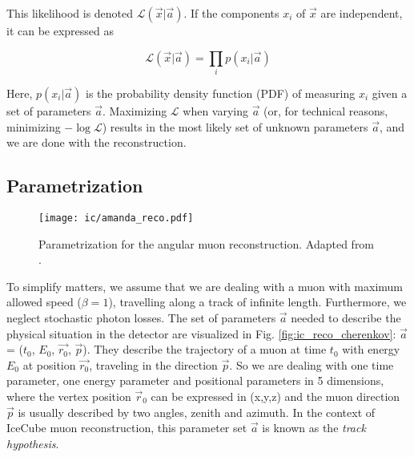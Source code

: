 This likelihood is denoted $\mathcal{L}(\vec{x}|\vec{a})$. If the components $x_i$ of $\vec{x}$ are independent, it can be expressed as

\begin{equation}
\mathcal{L}(\vec{x}|\vec{a}) = \prod_i p(x_i|\vec{a})
\end{equation}

Here, $p(x_i|\vec{a})$ is the probability density function (PDF) of measuring $x_i$ given a set of parameters $\vec{a}$. Maximizing $\mathcal{L}$ when varying $\vec{a}$ (or, for technical reasons, minimizing $-\log{\mathcal{L}}$) results in the most likely set of unknown parameters $\vec{a}$, and we are done with the reconstruction.

\subsection{Parametrization}
\begin{figure}[h!]
    \texttt{[image: ic/amanda\_reco.pdf]}
    \caption[Angular reconstruction in IceCube]{Parametrization for the angular muon reconstruction. Adapted from \cite{Ahrens2004}.}
\end{figure}

To simplify matters, we assume that we are dealing with a muon with maximum allowed speed ($\beta=1$), travelling along a track of infinite length. Furthermore, we neglect stochastic photon losses. The set of parameters $\vec{a}$ needed to describe the physical situation in the detector are visualized in Fig. \ref{fig:ic_reco_cherenkov}: $\vec{a}$ = ($t_0$, $E_0$, $\vec{r_0}$, $\vec{p}$). They describe the trajectory of a muon at time $t_0$ with energy $E_0$ at position $\vec{r_0}$, traveling in the direction $\vec{p}$. So we are dealing with one time parameter, one energy parameter and positional parameters in 5 dimensions, where the vertex position $\vec{r}_0$ can be expressed in (x,y,z) and the muon direction $\vec{p}$ is usually described by two angles, zenith and azimuth. In the context of IceCube muon reconstruction, this parameter set $\vec{a}$ is known as the \textit{track hypothesis}.

